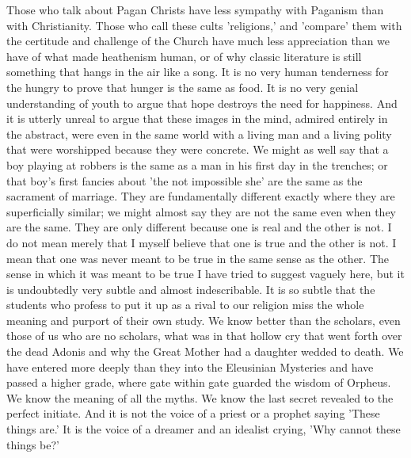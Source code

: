 Those who talk about Pagan Christs have less sympathy with Paganism than with Christianity. Those who call these cults 'religions,' and 'compare' them with the certitude and challenge of the Church have much less appreciation than we have of what made heathenism human, or of why classic literature is still something that hangs in the air like a song. It is no very human tenderness for the hungry to prove that hunger is the same as food. It is no very genial understanding of youth to argue that hope destroys the need for happiness. And it is utterly unreal to argue that these images in the mind, admired entirely in the abstract, were even in the same world with a living man and a living polity that were worshipped because they were concrete. We might as well say that a boy playing at robbers is the same as a man in his first day in the trenches; or that boy's first fancies about 'the not impossible she' are the same as the sacrament of marriage. They are fundamentally different exactly where they are superficially similar; we might almost say they are not the same even when they are the same. They are only different because one is real and the other is not. I do not mean merely that I myself believe that one is true and the other is not. I mean that one was never meant to be true in the same sense as the other. The sense in which it was meant to be true I have tried to suggest vaguely here, but it is undoubtedly very subtle and almost indescribable. It is so subtle that the students who profess to put it up as a rival to our religion miss the whole meaning and purport of their own study. We know better than the scholars, even those of us who are no scholars, what was in that hollow cry that went forth over the dead Adonis and why the Great Mother had a daughter wedded to death. We have entered more deeply than they into the Eleusinian Mysteries and have passed a higher grade, where gate within gate guarded the wisdom of Orpheus. We know the meaning of all the myths. We know the last secret revealed to the perfect initiate. And it is not the voice of a priest or a prophet saying 'These things are.' It is the voice of a dreamer and an idealist crying, 'Why cannot these things be?'


